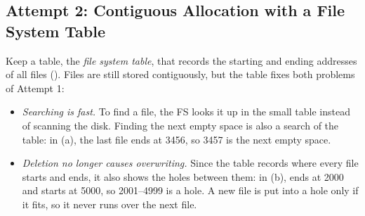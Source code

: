 \subsection{Attempt 2: Contiguous Allocation with a File System Table}

Keep a table, the \emph{file system table}, that records the starting and ending addresses of all files (). Files are still stored contiguously, but the table fixes both problems of Attempt 1:
\begin{itemize}
  \item \emph{Searching is fast.} To find a file, the FS looks it up in the small table instead of scanning the disk. Finding the next empty space is also a search of the table: in (a), the last file ends at 3456, so 3457 is the next empty space.
  \item \emph{Deletion no longer causes overwriting.} Since the table records where every file starts and ends, it also shows the holes between them: in (b),  ends at 2000 and  starts at 5000, so 2001--4999 is a hole. A new file is put into a hole only if it fits, so it never runs over the next file.
\end{itemize}


